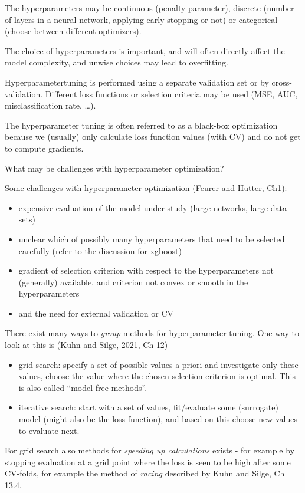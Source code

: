 \documentclass[
  ignorenonframetext,
]{beamer}
\providecommand{\tightlist}{%
  \setlength{\itemsep}{0pt}\setlength{\parskip}{0pt}}
\begin{document}
\begin{frame}
The hyperparameters may be continuous (penalty parameter), discrete
(number of layers in a neural network, applying early stopping or not)
or categorical (choose between different optimizers).

The choice of hyperparameters is important, and will often directly
affect the model complexity, and unwise choices may lead to overfitting.
\end{frame}

\begin{frame}
Hyperparametertuning is performed using a separate validation set or by
cross-validation. Different loss functions or selection criteria may be
used (MSE, AUC, misclassification rate, \ldots).

The hyperparameter tuning is often referred to as a black-box
optimization because we (usually) only calculate loss function values
(with CV) and do not get to compute gradients.

What may be challenges with hyperparameter optimization?
\end{frame}

\begin{frame}
Some challenges with hyperparameter optimization (Feurer and Hutter,
Ch1):

\begin{itemize}
\tightlist
\item
  expensive evaluation of the model under study (large networks, large
  data sets)
\item
  unclear which of possibly many hyperparameters that need to be
  selected carefully (refer to the discussion for xgboost)
\item
  gradient of selection criterion with respect to the hyperparameters
  not (generally) available, and criterion not convex or smooth in the
  hyperparameters
\item
  and the need for external validation or CV
\end{itemize}
\end{frame}

\begin{frame}
There exist many ways to \emph{group} methods for hyperparameter tuning.
One way to look at this is (Kuhn and Silge, 2021, Ch 12)

\begin{itemize}
\tightlist
\item
  grid search: specify a set of possible values a priori and investigate
  only these values, choose the value where the chosen selection
  criterion is optimal. This is also called ``model free methods''.
\item
  iterative search: start with a set of values, fit/evaluate some
  (surrogate) model (might also be the loss function), and based on this
  choose new values to evaluate next.
\end{itemize}

For grid search also methods for \emph{speeding up calculations} exists
- for example by stopping evaluation at a grid point where the loss is
seen to be high after some CV-folds, for example the method of
\emph{racing} described by Kuhn and Silge, Ch 13.4.
\end{frame}
\end{document}
